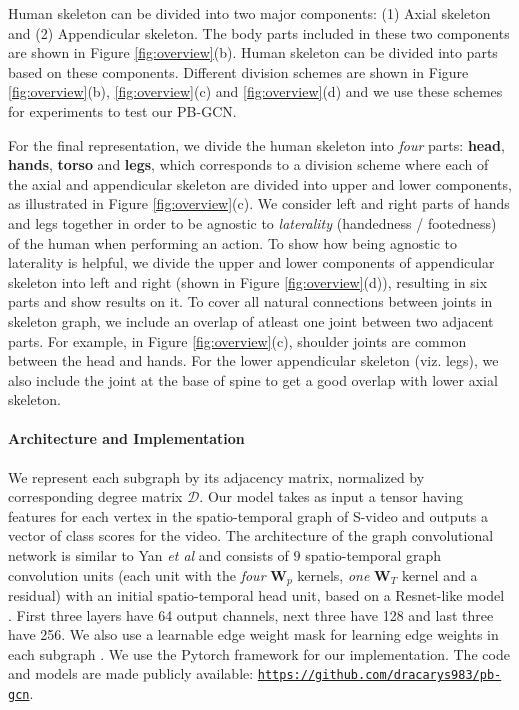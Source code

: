 \documentclass{bmvc2k}
\def\etal{\emph{et al}\bmvaOneDot}
\begin{document}
Human skeleton can be divided into two major components: (1) Axial skeleton and (2) Appendicular skeleton. The body parts included in these two components are shown in Figure \ref{fig:overview}(b). Human skeleton can be divided into parts based on these components. Different division schemes are shown in Figure \ref{fig:overview}(b), \ref{fig:overview}(c) and \ref{fig:overview}(d) and we use these schemes for experiments to test our PB-GCN.

For the final representation, we divide the human skeleton into \textit{four} parts: \textbf{head}, \textbf{hands}, \textbf{torso} and \textbf{legs}, which corresponds to a division scheme where each of the axial and appendicular skeleton are divided into upper and lower components, as illustrated in Figure \ref{fig:overview}(c). We consider left and right parts of hands and legs together in order to be agnostic to \textit{laterality} \cite{lateral} (handedness / footedness) of the human when performing an action. To show how being agnostic to laterality is helpful, we divide the upper and lower components of appendicular skeleton into left and right (shown in Figure \ref{fig:overview}(d)), resulting in six parts and show results on it. To cover all natural connections between joints in skeleton graph, we include an overlap of atleast one joint between two adjacent parts. For example, in Figure \ref{fig:overview}(c), shoulder joints are common between the head and hands. For the lower appendicular skeleton (viz. legs), we also include the joint at the base of spine to get a good overlap with lower axial skeleton.

\paragraph{Architecture and Implementation} We represent each subgraph by its adjacency matrix, normalized by corresponding degree matrix $\mathcal{D}$. Our model takes as input a tensor having features for each vertex in the spatio-temporal graph of S-video and outputs a vector of class scores for the video. The architecture of the graph convolutional network is similar to Yan \etal \cite{yan2018spatial} and consists of $9$ spatio-temporal graph convolution units (each unit with the \textit{four} $\mathbf{W}_{p}$ kernels, \textit{one} $\mathbf{W}_{T}$ kernel and a residual) with an initial spatio-temporal head unit, based on a Resnet-like model \cite{he2016deep}. First three layers have 64 output channels, next three have 128 and last three have 256. We also use a learnable edge weight mask for learning edge weights in each subgraph \cite{yan2018spatial}. We use the Pytorch framework \cite{paszke2017automatic} for our implementation. The code and models are made publicly available: \href{https://github.com/dracarys983/pb-gcn}{\texttt{https://github.com/dracarys983/pb-gcn}}.
\end{document}
